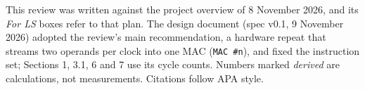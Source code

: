 \documentclass[11pt]{article}
\begin{document}

\lstoc
\clearpage
{}
\begin{aside}
This review was written against the project overview of 8 November 2026, and its \emph{For LS} boxes refer to that plan. The design document (spec v0.1, 9 November 2026) adopted the review's main recommendation, a hardware repeat that streams two operands per clock into one MAC (\texttt{MAC \#n}), and fixed the instruction set; Sections 1, 3.1, 6 and 7 use its cycle counts. Numbers marked \emph{derived} are calculations, not measurements. Citations follow APA style.
\end{aside}

\end{document}
